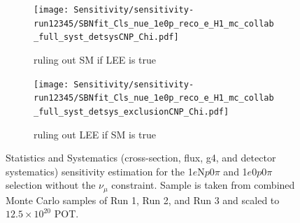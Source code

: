 \documentclass[a4paper]{article}
\newcommand{\numu}{$\nu_{\mu}$\xspace}
\newcommand{\npsel}{1$e$N$p$0$\pi$\xspace}
\newcommand{\zpsel}{1$e$0$p$0$\pi$\xspace}
\begin{document}
\begin{figure}[H]
    \centering
    \begin{subfigure}[b]{0.48\textwidth}
    \centering
    \texttt{[image: Sensitivity/sensitivity-run12345/SBNfit\_Cls\_nue\_1e0p\_reco\_e\_H1\_mc\_collab\_full\_syst\_detsysCNP\_Chi.pdf]}
    \caption{ruling out SM if LEE is true}
    \end{subfigure}
    \begin{subfigure}[b]{0.48\textwidth}
    \centering
    \texttt{[image: Sensitivity/sensitivity-run12345/SBNfit\_Cls\_nue\_1e0p\_reco\_e\_H1\_mc\_collab\_full\_syst\_detsys\_exclusionCNP\_Chi.pdf]}
    \caption{ruling out LEE if SM is true}
    \end{subfigure}
    \caption{Statistics and Systematics (cross-section, flux, g4, and detector systematics) sensitivity estimation for the \npsel and \zpsel selection without the \numu constraint. Sample is taken from combined Monte Carlo samples of Run 1, Run 2, and Run 3 and scaled to $12.5\times10^20$ POT.}
    \label{fig:1eNp:BDT:statsystsensitivity}
\end{figure}
\end{document}
